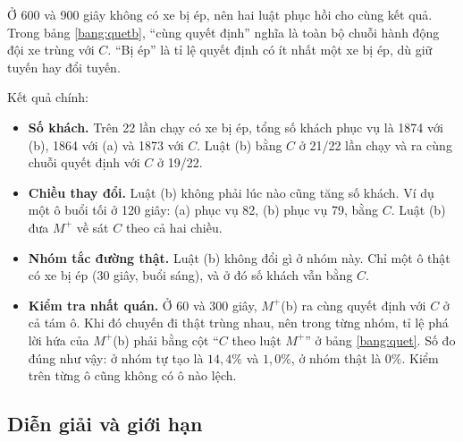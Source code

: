 Ở 600 và 900 giây không có xe bị ép, nên hai luật phục hồi cho cùng kết quả. Trong bảng
\ref{bang:quetb}, ``cùng quyết định'' nghĩa là toàn bộ chuỗi hành động đội xe trùng với $C$. ``Bị ép'' là
tỉ lệ quyết định có ít nhất một xe bị ép, dù giữ tuyến hay đổi tuyến.

Kết quả chính:
\begin{itemize}
\item \textbf{Số khách.} Trên 22 lần chạy có xe bị ép, tổng số khách phục vụ là 1874 với (b), 1864 với (a)
và 1873 với $C$. Luật (b) bằng $C$ ở 21/22 lần chạy và ra cùng chuỗi quyết định với $C$ ở 19/22.
\item \textbf{Chiều thay đổi.} Luật (b) không phải lúc nào cũng tăng số khách. Ví dụ một ô buổi tối ở
120 giây: (a) phục vụ 82, (b) phục vụ 79, bằng $C$. Luật (b) đưa $M^{+}$ về sát $C$ theo cả hai chiều.
\item \textbf{Nhóm tắc đường thật.} Luật (b) không đổi gì ở nhóm này. Chỉ một ô thật có xe bị ép (30 giây,
buổi sáng), và ở đó số khách vẫn bằng $C$.
\item \textbf{Kiểm tra nhất quán.} Ở 60 và 300 giây, $M^{+}$(b) ra cùng quyết định với $C$ ở cả tám ô. Khi
đó chuyến đi thật trùng nhau, nên trong từng nhóm, tỉ lệ phá lời hứa của $M^{+}$(b) phải bằng cột
``$C$ theo luật $M^{+}$'' ở bảng \ref{bang:quet}. Số đo đúng như vậy: ở nhóm tự tạo là $14{,}4\%$ và
$1{,}0\%$, ở nhóm thật là $0\%$. Kiểm trên từng ô cũng không có ô nào lệch.
\end{itemize}

\subsection{Diễn giải và giới hạn}

